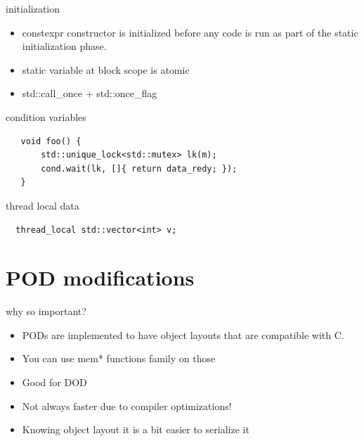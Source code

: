 \documentclass{beamer}
\begin{document}
\begin{frame}{initialization}
  \begin{block}{}
    \begin{itemize}
    \item constexpr constructor is initialized before any code is run
      as part of the static initialization phase.
    \item static variable at block scope is atomic
    \item std::call\_once + std::once\_flag
    \end{itemize}
  \end{block}
\end{frame}

\begin{frame}[fragile]{condition variables}
\begin{block}{}
\begin{verbatim}
   void foo() {
       std::unique_lock<std::mutex> lk(m);
       cond.wait(lk, []{ return data_redy; });
   }

\end{verbatim}
\end{block}
\end{frame}

\begin{frame}[fragile]{thread local data}
  \begin{block}{}
\begin{verbatim}
  thread_local std::vector<int> v;

\end{verbatim}
  \end{block}
\end{frame}

\section{POD modifications}
\begin{frame}{why so important?}
  \begin{itemize}
  \item PODs are implemented to have object layouts that are compatible with
    C.
  \item You can use mem* functions family on those
  \item Good for DOD
  \item Not always faster due to compiler optimizations!
  \item Knowing object layout it is a bit easier to serialize it
  \end{itemize}
\end{frame}
\end{document}
